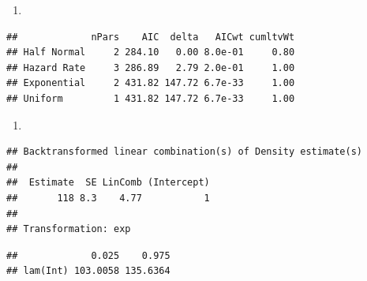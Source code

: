 \documentclass[
]{article}
\providecommand{\tightlist}{%
  \setlength{\itemsep}{0pt}\setlength{\parskip}{0pt}}
\begin{document}
\begin{enumerate}
\def\labelenumi{\arabic{enumi}.}
\setcounter{enumi}{21}
\tightlist
\item
\end{enumerate}

\begin{verbatim}
##             nPars    AIC  delta   AICwt cumltvWt
## Half Normal     2 284.10   0.00 8.0e-01     0.80
## Hazard Rate     3 286.89   2.79 2.0e-01     1.00
## Exponential     2 431.82 147.72 6.7e-33     1.00
## Uniform         1 431.82 147.72 6.7e-33     1.00
\end{verbatim}

\begin{enumerate}
\def\labelenumi{\arabic{enumi}.}
\setcounter{enumi}{22}
\tightlist
\item
\end{enumerate}

\begin{verbatim}
## Backtransformed linear combination(s) of Density estimate(s)
## 
##  Estimate  SE LinComb (Intercept)
##       118 8.3    4.77           1
## 
## Transformation: exp
\end{verbatim}

\begin{verbatim}
##             0.025    0.975
## lam(Int) 103.0058 135.6364
\end{verbatim}
\end{document}
